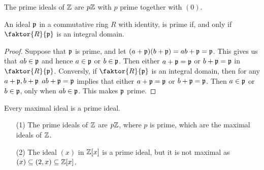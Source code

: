 \begin{example}\label{example_5.16}
  The prime ideals of $\mathbb{Z}$ are $p\mathbb{Z}$ with  $p$ prime together with $(0)$.
\end{example}

\begin{lemma}\label{lemma_5.4.6}
  An ideal $\mathfrak{p}$ in a commutative ring $R$ with identity, is prime if, and
  only if $\faktor{R}{\pf}$ is an integral domain.
\end{lemma}
\begin{proof}
  Suppose that $\mathfrak{p}$ is prime, and let  $(a+\mathfrak{p})(b+\mathfrak{p})=ab+\mathfrak{p}=\mathfrak{p}$. This gives us
  that $ab \in \mathfrak{p}$ and hence  $a \in \mathfrak{p}$ or  $b \in \mathfrak{p}$. Then either $a+\mathfrak{p}=\mathfrak{p}$
  or $b+\mathfrak{p}=\mathfrak{p}$ in $\faktor{R}{\pf}$. Conversly, if $\faktor{R}{\pf}$ is an
  integral domain, then for any $a+\mathfrak{p},b+\mathfrak{p}$  $ab+\mathfrak{p}=\mathfrak{p}$ implies that either
  $a+\mathfrak{p}=\mathfrak{p}$ or  $b+\mathfrak{p}=\mathfrak{p}$. Then $a \in \mathfrak{p}$ or  $b \in \mathfrak{p}$, only when
  $ab \in \mathfrak{p}$. This makes  $\mathfrak{p}$ prime.
\end{proof}
\begin{corollary}
  Every maximal ideal is a prime ideal.
\end{corollary}

\begin{example}\label{example_5.17}
  \begin{enumerate}
    \item[(1)] The prime ideals of $\mathbb{Z}$ are $p\mathbb{Z}$, where $p$ is prime, which
      are the maximal ideals of $\mathbb{Z}$.

    \item[(2)] The ideal $(x)$ in $\mathbb{Z}[x]$ is a prime ideal, but it is not
      maximal as $(x) \subseteq (2,x) \subseteq \mathbb{Z}[x]$.
  \end{enumerate}
\end{example}
